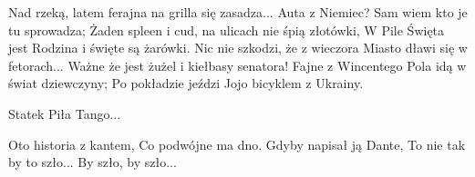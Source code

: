 \documentclass[../../../songbook.tex]{subfiles}
\begin{document}
\begin{multicols}{2}
{Nad rzeką, latem ferajna na grilla się zasadza...	\newline
Auta z Niemiec? Sam wiem kto je tu sprowadza;	\newline
Żaden spleen i cud, na ulicach nie śpią złotówki,	\newline
W Pile Święta jest Rodzina i święte są żarówki.	\newline
Nic nie szkodzi, że z wieczora 	\newline
Miasto dławi się w fetorach...	\newline
Ważne że jest żużel i kiełbasy senatora!	\newline
Fajne z Wincentego Pola idą w świat dziewczyny;	\newline
Po pokładzie jeździ Jojo bicyklem z Ukrainy.	\newline

\-\hspace{0.5cm} Statek Piła Tango...	\newline

Oto historia z kantem,	\newline
Co podwójne ma dno.	\newline
Gdyby napisał ją Dante,	\newline
To nie tak by to szło...	\newline
By szło, by szło...	\newline
}
\end{multicols}
\end{document}
